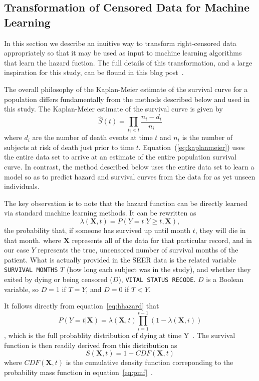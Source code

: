 \documentclass[10pt,letterpaper]{article}
\newcommand{\codewhite}[1]{\colorbox{white}{\texttt{#1}}}
\begin{document}
\subsection*{Transformation of Censored Data for Machine Learning}
\label{subsec:transformation}

In this section we describe an inuitive way to transform right-censored data appropriately so that it may be used as input to machine learning algorithms that learn the hazard fuction. The full details of this transformation, and a large inspiration for this study, can be flound in this blog post~\cite{kuhn}.



The overall philosophy of the Kaplan-Meier estimate of the survival curve for a population differs fundamentally from the methods described below and used in this study. 
The Kaplan-Meier estimate of the survival curve is given by
\begin{equation}
\label{eq:kaplanmeier}
\hat{S}(t) = \prod_{t_i < t} \frac{n_i - d_i}{n_i}
\end{equation}
where $d_i$ are the number of death events at time $t$ and $n_t$ is the number of subjects at risk of death just prior to time $t$. 
Equation~(\ref{eq:kaplanmeier}) uses the entire data set to arrive at an estimate of the entire population survival curve. In contrast, the method described below uses the entire data set to learn a model so as to predict hazard and survival curves from the data for as yet unseen individuals.


The key observation is to note that the hazard function can be directly learned via standard machine learning methods. It can be rewritten as
\begin{equation}
\label{eq:hhazard}
\lambda(\mathbf{X}, t) = P(Y = t|Y \geq t, \mathbf{X}),
\end{equation}
the probability that, if someone has survived up until month $t$, they will die in that month.
where $\mathbf{X}$ represents all of the data for that particular record, and in our case $Y$ represents the true, uncensored number of survival months of the patient.
What is actually provided in the SEER data is the related variable \codewhite{SURVIVAL MONTHS} $T$ (how long each subject was in the study), and whether they exited by dying or being censored ($D$), \codewhite{VITAL STATUS RECODE}. 
$D$ is a Boolean variable, so $D = 1$ if $T = Y$, and $D = 0$ if $T < Y$.



It follows directly from equation~\ref{eq:hhazard} that 
\begin{equation}
\label{eq:pmf}
P(Y = t | \mathbf{X}) = \lambda(\mathbf{X}, t) \prod_{i=1}^{t-1} (1 - \lambda(\mathbf{X}, i))
\end{equation},
which is the full probablity distribution of dying at time Y~\cite{kuhn}.
The survival function is then readily derived from this distribution as
\begin{equation}
\label{eq:cdf}
S(\mathbf{X},t) = 1 - CDF(\mathbf{X}, t)
\end{equation}
where $CDF(\mathbf{X}, t)$ is the cumulative density function correponding to the probability mass function in equation~\ref{eq:pmf}~\cite{downey}.
\end{document}
